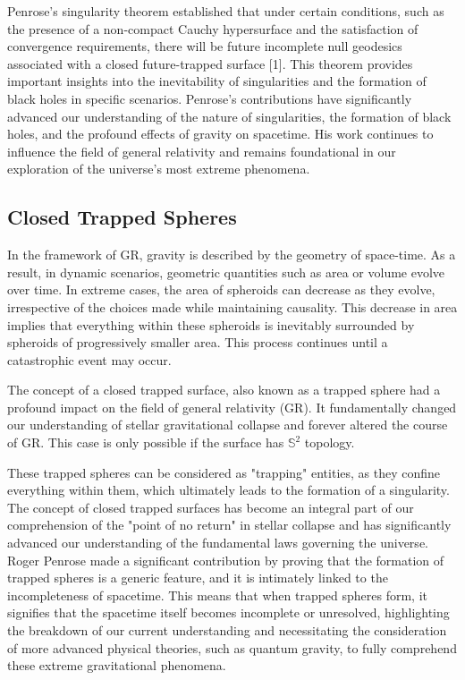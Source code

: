 \documentclass{article}
\begin{document}
Penrose's singularity theorem established that under certain conditions, such as the presence of a non-compact Cauchy hypersurface and the satisfaction of convergence requirements, there will be future incomplete null geodesics associated with a closed future-trapped surface [1]. This theorem provides important insights into the inevitability of singularities and the formation of black holes in specific scenarios.
Penrose's contributions have significantly advanced our understanding of the nature of singularities, the formation of black holes, and the profound effects of gravity on spacetime. His work continues to influence the field of general relativity and remains foundational in our exploration of the universe's most extreme phenomena.


\subsection{\large Closed Trapped Spheres}

\large

In the framework of GR, gravity is described by the geometry of space-time. As a result, in dynamic scenarios, geometric quantities such as area or volume evolve over time. In extreme cases, the area of spheroids can decrease as they evolve, irrespective of the choices made while maintaining causality. This decrease in area implies that everything within these spheroids is inevitably surrounded by spheroids of progressively smaller area. This process continues until a catastrophic event may occur.

The concept of a closed trapped surface, also known as a trapped sphere had a profound impact on the field of general relativity (GR). It fundamentally changed our understanding of stellar gravitational collapse and forever altered the course of GR. This case is only possible if the surface has $\mathbb{S}^2$ topology.

 These trapped spheres can be considered as "trapping" entities, as they confine everything within them, which ultimately leads to the formation of a singularity.
The concept of closed trapped surfaces has become an integral part of our comprehension of the "point of no return" in stellar collapse and has significantly advanced our understanding of the fundamental laws governing the universe.
Roger Penrose made a significant contribution by proving that the formation of trapped spheres is a generic feature, and it is intimately linked to the incompleteness of spacetime. This means that when trapped spheres form, it signifies that the spacetime itself becomes incomplete or unresolved, highlighting the breakdown of our current understanding and necessitating the consideration of more advanced physical theories, such as quantum gravity, to fully comprehend these extreme gravitational phenomena.
\end{document}
